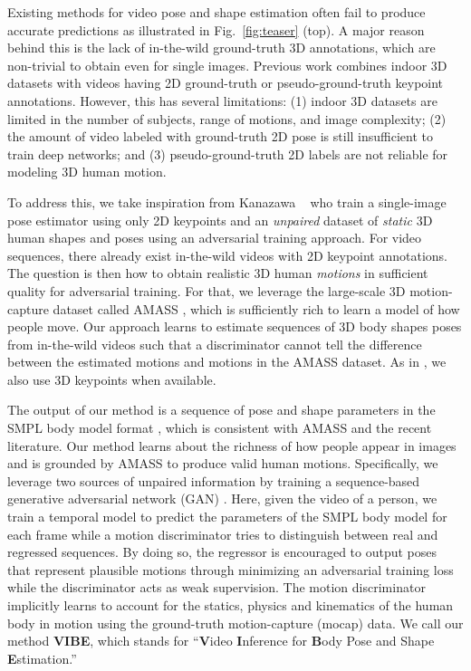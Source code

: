 \documentclass[10pt,twocolumn,letterpaper]{article}
\begin{document}
Existing methods for video pose and shape estimation \cite{kanazawa_temporal_hmr, Sun_2019_ICCV} often fail to produce accurate predictions as illustrated in Fig.~\ref{fig:teaser} (top).
A major reason behind this is the lack of in-the-wild ground-truth 3D annotations, which are non-trivial to obtain even for single images.
Previous work \cite{kanazawa_temporal_hmr, Sun_2019_ICCV} combines indoor 3D datasets with videos having 2D ground-truth or pseudo-ground-truth keypoint annotations. 
However, this has several limitations:
(1) indoor 3D datasets are limited in the number of subjects, range of motions, and image complexity; 
(2) the amount of video labeled with ground-truth 2D pose is still insufficient to train deep networks; and 
(3) pseudo-ground-truth 2D labels are not reliable for modeling 3D human motion. 

To address this, we take inspiration from Kanazawa \etal~\cite{kanazawa_hmr} who train a single-image pose estimator using only 2D keypoints and an {\em unpaired} dataset of {\em static} 3D human shapes and poses using an adversarial training approach.
For video sequences, there already exist in-the-wild videos with 2D keypoint annotations. 
The question is then how to obtain realistic 3D human {\em motions} in sufficient quality for adversarial training.
For that, we leverage the  large-scale 3D motion-capture dataset called AMASS \cite{AMASS:2019}, which is sufficiently rich to learn a model of how people move.
Our approach learns to estimate sequences of 3D body shapes poses from in-the-wild videos such that a discriminator cannot tell the difference between the estimated motions and motions in the AMASS dataset.
As in \cite{kanazawa_hmr}, we also use 3D keypoints when available.

The output of our method is a sequence of pose and shape parameters in the SMPL body model format \cite{looper_smpl}, which is consistent with AMASS and the recent literature.
Our method learns about the richness of how people appear in images and is grounded by AMASS to produce valid human motions. Specifically, we leverage two sources of unpaired information by training a sequence-based generative adversarial network (GAN) \cite{goodfellow_gan}. 
Here, given the video of a person, we train a temporal model to predict the parameters of the SMPL body model for each frame while a motion discriminator tries to distinguish between real and regressed sequences. 
By doing so, the regressor is encouraged to output poses that represent plausible motions through minimizing an adversarial training loss while the discriminator acts as weak supervision. 
The motion discriminator implicitly learns to account for the statics, physics and kinematics of the human body in motion using the ground-truth motion-capture (mocap) data. 
We call our method {\bf VIBE}, which stands for ``\textbf{V}ideo \textbf{I}nference for \textbf{B}ody Pose and Shape \textbf{E}stimation.''
\end{document}
